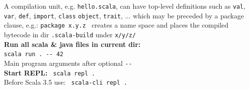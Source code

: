 \documentclass[article, a5paper]{memoir}
\newcommand{\code}{\lstinline[basicstyle=\ttfamily]}
\begin{document}
\hfill\begin{minipage}{0.42\linewidth}
\raggedright{\small\vspace{0.2em}
A compilation unit, e.g. \code{hello.scala}, can have top-level definitions such as \code{val}, \code{var}, \code{def}, \code{import}, \code{class} \code{object}, \code{trait}, ... which may be preceded by a package clause, e.g.: \code|package x.y.z | creates a name space and places the compiled bytecode in dir \code{.scala-build} under  \code{x/y/z/}\\[0.5em]

\textbf{Run all scala \& java files in current dir:}\\
\verb|scala run . -- 42|\\Main program arguments after optional \code{--} 
\\[0.2em]
\textbf{Start REPL:} ~\verb|scala repl .|\\[0.25em]
Before Scala 3.5 use: ~\verb|scala-cli repl .|\\[0.2em]
\hfill

}%
\end{minipage}
\end{document}
